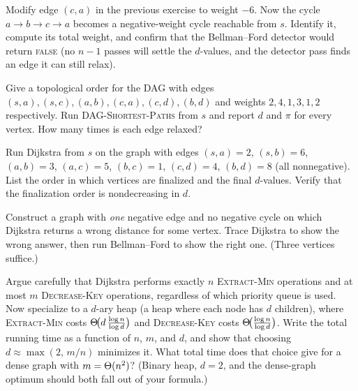 \begin{exercise}\label{ch24:ex-neg-cycle}
Modify edge $(c,a)$ in the previous exercise to weight $-6$. Now the cycle
$a\to b\to c\to a$ becomes a negative-weight cycle reachable from $s$. Identify it,
compute its total weight, and confirm that the Bellman--Ford detector would return
\textsc{false} (no $n-1$ passes will settle the $d$-values, and the detector pass
finds an edge it can still relax).
\end{exercise}

\begin{exercise}\label{ch24:ex-dag}
Give a topological order for the DAG with edges
$(s,a),(s,c),(a,b),(c,a),(c,d),(b,d)$ and weights
$2,4,1,3,1,2$ respectively. Run \textsc{DAG-Shortest-Paths} from $s$ and report
$d$ and $\pi$ for every vertex. How many times is each edge relaxed?
\end{exercise}

\begin{exercise}\label{ch24:ex-dijkstra-trace}
Run Dijkstra from $s$ on the graph with edges $(s,a)=2$, $(s,b)=6$, $(a,b)=3$,
$(a,c)=5$, $(b,c)=1$, $(c,d)=4$, $(b,d)=8$ (all nonnegative). List the order in
which vertices are finalized and the final $d$-values. Verify that the
finalization order is nondecreasing in $d$.
\end{exercise}

\begin{exercise}\label{ch24:ex-dijkstra-fail}
Construct a graph with \emph{one} negative edge and no negative cycle on which
Dijkstra returns a wrong distance for some vertex. Trace Dijkstra to show the
wrong answer, then run Bellman--Ford to show the right one. (Three vertices
suffice.)
\end{exercise}

\begin{exercise}\label{ch24:ex-pq-counts}
Argue carefully that Dijkstra performs exactly $n$ \textsc{Extract-Min} operations
and at most $m$ \textsc{Decrease-Key} operations, regardless of which priority
queue is used. Now specialize to a $d$-ary heap (a heap where each node has $d$
children), where \textsc{Extract-Min} costs $\Theta\!\big(d\,\frac{\log n}{\log d}\big)$
and \textsc{Decrease-Key} costs $\Theta\!\big(\frac{\log n}{\log d}\big)$. Write the
total running time as a function of $n$, $m$, and $d$, and show that choosing
$d \approx \max(2,\, m/n)$ minimizes it. What total time does that choice give for a
dense graph with $m = \Theta(n^2)$? (Binary heap, $d=2$, and the dense-graph optimum
should both fall out of your formula.)
\end{exercise}

